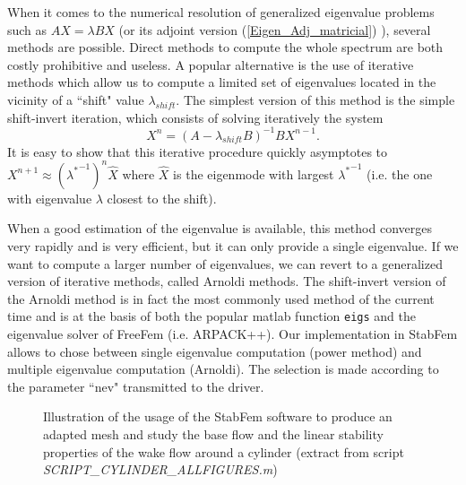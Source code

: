 \documentclass[twocolumn,10pt]{asme2ej}
\begin{document}
When it comes to the numerical resolution of generalized eigenvalue problems such as $A X = \lambda B X$ (or its adjoint version (\ref{Eigen_Adj_matricial}) ), several methods are possible. Direct methods to compute the whole spectrum are both costly prohibitive and useless. A popular alternative is the use of iterative methods which allow us to compute a limited set of eigenvalues located in the vicinity of a 
``shift" value $\lambda_{shift}$. The simplest version of this method is the simple shift-invert iteration, which consists of solving iteratively the system
$$
X^{n} =  (A- \lambda_{shift} B)^{-1} B X^{n-1}.
$$ 
It is easy to show that this iterative procedure quickly asymptotes to $X^{n+1} \approx ({\lambda^*}^{-1})^n \hat{X}$
where $\hat{X}$ is the eigenmode with largest ${\lambda^*}^{-1}$ (i.e. the one with eigenvalue $\lambda$ closest to the shift). 


When a good estimation of the eigenvalue is available, this method converges very rapidly and is very efficient, but it can only provide a single eigenvalue.
If we want to compute a larger number of eigenvalues, we can revert to a generalized version of iterative methods, called Arnoldi methods\cite{Arnoldi51}. The shift-invert version of the Arnoldi method is in fact the most commonly used method of the current time and is at the basis of both the popular matlab function {\tt{eigs}} and the eigenvalue solver of FreeFem (i.e. ARPACK++). Our implementation in StabFem allows to chose between single eigenvalue computation (power method) and multiple eigenvalue computation (Arnoldi). The selection is made according to the parameter ``nev" transmitted to the driver.



\begin{figure}[t]
\small

 \normalsize
\caption{Illustration of the usage of the StabFem software to produce an adapted mesh and study the base flow and the linear stability properties of the wake flow around a cylinder 
(extract from script {\em SCRIPT\_CYLINDER\_ALLFIGURES.m})}
\label{Listing2}
\end{figure}
\end{document}
